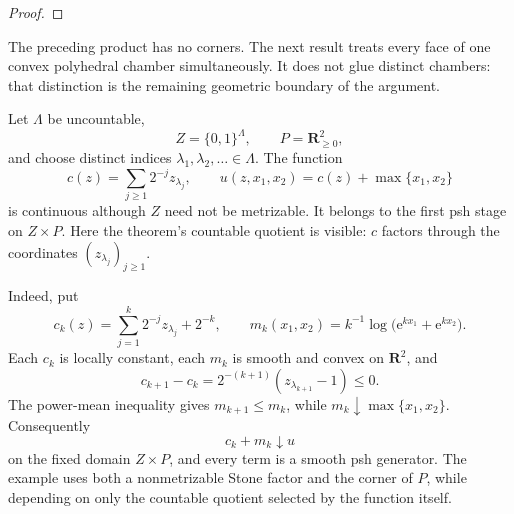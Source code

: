 \begin{theorem}
\label{thm:p071-stone-euclidean-collapse}

\end{theorem}

\begin{proof}

\end{proof}

The preceding product has no corners.  The next result treats every face of
one convex polyhedral chamber simultaneously.  It does not glue distinct
chambers: that distinction is the remaining geometric boundary of the
argument.

\begin{theorem}
\label{thm:p071-stone-polyhedral-collapse}

\end{theorem}



\begin{example}
\label{ex:ch16-stone-polyhedral-countable-quotient}
Let $\Lambda$ be uncountable,
\[
             Z=\{0,1\}^{\Lambda},
        \qquad P=\mathbf R_{\geq0}^2,
\]
and choose distinct indices $\lambda_1,\lambda_2,\ldots\in\Lambda$.
The function
\[
 c(z)=\sum_{j\geq1}2^{-j}z_{\lambda_j},
 \qquad
 u(z,x_1,x_2)=c(z)+\max\{x_1,x_2\}
\]
is continuous although $Z$ need not be metrizable.  It belongs to the
first psh stage on $Z\times P$.  Here the theorem's countable quotient is
visible: $c$ factors through the coordinates $(z_{\lambda_j})_{j\geq1}$.

Indeed, put
\[
 c_k(z)=\sum_{j=1}^k2^{-j}z_{\lambda_j}+2^{-k},
 \qquad
 m_k(x_1,x_2)
   =k^{-1}\log\bigl(\mathrm e^{kx_1}+\mathrm e^{kx_2}\bigr).
\]
Each $c_k$ is locally constant, each $m_k$ is smooth and convex on
$\mathbf R^2$, and
\[
 c_{k+1}-c_k
   =2^{-(k+1)}(z_{\lambda_{k+1}}-1)\leq0.
\]
The power-mean inequality gives $m_{k+1}\leq m_k$, while
$m_k\downarrow\max\{x_1,x_2\}$.  Consequently
\[
                   c_k+m_k\downarrow u
\]
on the fixed domain $Z\times P$, and every term is a smooth psh
generator.  The example uses both a nonmetrizable Stone factor and the
corner of $P$, while depending on only the countable quotient selected by
the function itself.
\end{example}

